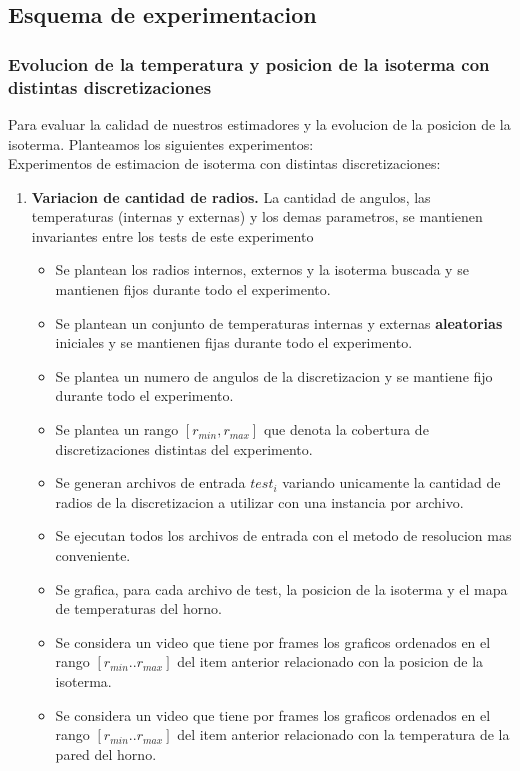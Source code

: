 \subsection{Esquema de experimentacion}
\subsubsection{Evolucion de la temperatura y posicion de la isoterma con distintas discretizaciones}
Para evaluar la calidad de nuestros estimadores y la evolucion de la posicion de la isoterma. Planteamos los siguientes experimentos:\\
Experimentos de estimacion de isoterma con distintas discretizaciones:
\begin{enumerate}
    \item \textbf{Variacion de cantidad de radios.} La cantidad de angulos, las temperaturas (internas y externas) y los demas parametros, se mantienen invariantes entre los tests de este experimento\begin{itemize}
        \item Se plantean los radios internos, externos y la isoterma buscada y se mantienen fijos durante todo el experimento.
        \item Se plantean un conjunto de temperaturas internas y externas \textbf{aleatorias} iniciales y se mantienen fijas durante todo el experimento.
        \item Se plantea un numero de angulos de la discretizacion y se mantiene fijo durante todo el experimento. 
        \item Se plantea un rango $[r_{min}, r_{max}]$ que denota la cobertura de discretizaciones distintas del experimento.
        \item Se generan archivos de entrada $test_i$ variando unicamente la cantidad de radios de la discretizacion a utilizar con una instancia por archivo.
        \item Se ejecutan todos los archivos de entrada con el metodo de resolucion mas conveniente.
        \item Se grafica, para cada archivo de test, la posicion de la isoterma y el mapa de temperaturas del horno.
        \item Se considera un video que tiene por frames los graficos ordenados en el rango $[r_{min}..r_{max}]$ del item anterior relacionado con la posicion de la isoterma.
        \item Se considera un video que tiene por frames los graficos ordenados en el rango $[r_{min}..r_{max}]$ del item anterior relacionado con la temperatura de la pared del horno.

\end{itemize}
\end{enumerate}
